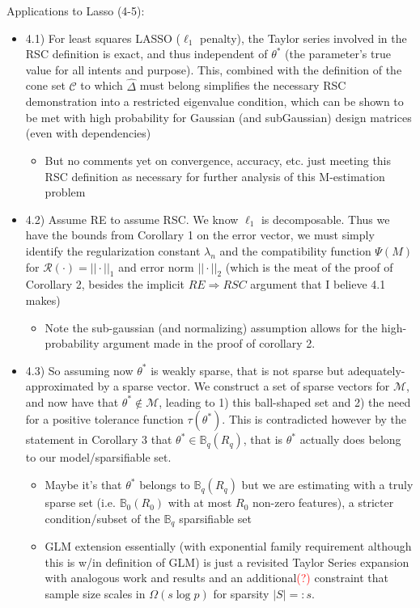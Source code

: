 \documentclass[11pt]{article}
\begin{document}
Applications to Lasso (4-5):

\begin{itemize}
	\item 4.1) For least squares LASSO ($\ell_1$ penalty), the Taylor series involved in the RSC definition is exact, and thus independent of $\theta^*$ (the parameter's true value for all intents and purpose). This, combined with the definition of the cone set $\mathcal{C}$ to which $\hat{\Delta}$ must belong simplifies the necessary RSC demonstration into a restricted eigenvalue condition, which can be shown to be met with high probability for Gaussian (and subGaussian) design matrices (even with dependencies)
    \begin{itemize}
        \item But no comments yet on convergence, accuracy, etc. just meeting this RSC definition as necessary for further analysis of this M-estimation problem 
    \end{itemize}
    \item 4.2) Assume RE to assume RSC. We know $\ell_1$ is decomposable. Thus we have the bounds from Corollary 1 on the error vector, we must simply identify the regularization constant $\lambda_n$ and the compatibility function $\Psi(M)$ for $\mathcal{R}(\cdot) = ||\cdot||_1$ and error norm $||\cdot||_2$ (which is the meat of the proof of Corollary 2, besides the implicit $RE \Rightarrow RSC$ argument that I believe 4.1 makes)
		\begin{itemize}
            \item Note the sub-gaussian (and normalizing) assumption allows for the high-probability argument made in the proof of corollary 2. 
        \end{itemize}
	\item 4.3) So assuming now $\theta^*$ is weakly sparse, that is not sparse but adequately-approximated by a sparse vector. We construct a set of sparse vectors for $\mathcal{M}$, and now have that $\theta^* \not\in \mathcal{M}$, leading to 1) this ball-shaped set and 2) the need for a positive tolerance function $\tau(\theta^*)$. This is contradicted however by the statement in Corollary 3 that $\theta^* \in \mathbb{B}_q(R_q)$, that is $\theta^*$ actually does belong to our model/sparsifiable set. 
	\begin{itemize}
        \item Maybe it's that $\theta^*$ belongs to $\mathbb{B}_q(R_q)$ but we are estimating with a truly sparse set (i.e. $\mathbb{B}_0(R_0)$ with at most $R_0$ non-zero features), a stricter condition/subset of the $\mathbb{B}_q$ sparsifiable set 
        \item GLM extension essentially (with exponential family requirement although this is w/in definition of GLM) is just a revisited Taylor Series expansion with analogous work and results and an additional\textcolor{red}{(?)} constraint that sample size scales in $\Omega(s \log p)$ for sparsity $|S|=:s$.
    \end{itemize}
\end{itemize}
\end{document}

